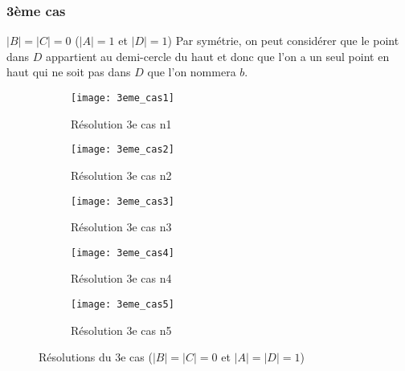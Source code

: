 \subsubsection*{3ème cas}\label{3cas} $|B| = |C| = 0$ ($|A| = 1$ et $|D| = 1$)
Par symétrie, on peut considérer que le point dans $D$ appartient au demi-cercle du haut et donc que l'on a un seul point en haut qui ne soit pas dans $D$ que l'on nommera $b$.

\begin{figure}[h!]
 \begin{subfigure}[t]{0.45\textwidth}
   \centering
   \texttt{[image: 3eme\_cas1]}
   \caption{Résolution 3e cas n1}
   \label{fig:3eme_cas1}
 \end{subfigure}
 \hfill
 \begin{subfigure}[t]{0.45\textwidth}
   \centering
  \texttt{[image: 3eme\_cas2]}
  \caption{Résolution 3e cas n2}
  \label{fig:3eme_cas2}
 \end{subfigure}
 \hfill 
 \begin{subfigure}[t]{0.45\textwidth}
   \centering
  \texttt{[image: 3eme\_cas3]}
  \caption{Résolution 3e cas n3}
  \label{fig:3eme_cas3}
 \end{subfigure}  
 \hfill 
 \begin{subfigure}[t]{0.45\textwidth}
   \centering
   \texttt{[image: 3eme\_cas4]}
   \caption{Résolution 3e cas n4}
   \label{fig:3eme_cas4}
 \end{subfigure}
 \hfill
 \begin{subfigure}[t]{0.45\textwidth}
   \centering
   \texttt{[image: 3eme\_cas5]}
   \caption{Résolution 3e cas n5}
   \label{fig:3eme_cas5}
 \end{subfigure}
 \caption{Résolutions du 3e cas ($|B| = |C| = 0$ et $|A| = |D| = 1$)}
\end{figure}

